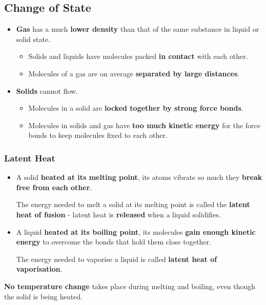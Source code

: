 \subsection{Change of State}

\begin{itemize}
    \item \textbf{Gas} has a much \textbf{lower density} than that of the same substance in liquid or solid state.
        \begin{itemize}
            \item Solids and liquids have molecules packed \textbf{in contact} with each other.
            \item Molecules of a gas are on average \textbf{separated by large distances}.
        \end{itemize}
    \item \textbf{Solids} cannot flow.
        \begin{itemize}
            \item Molecules in a solid are \textbf{locked together by strong force bonds}.
            \item Molecules in solids and gas have \textbf{too much kinetic energy} for the force bonds to keep molecules fixed to each other.
        \end{itemize}
\end{itemize}

\subsubsection*{Latent Heat}

\begin{itemize}
    \item A solid \textbf{heated at its melting point}, its atoms vibrate so much they \textbf{break free from each other}.

        The energy needed to melt a solid at its melting point is called the \textbf{latent heat of fusion} - latent heat is \textbf{released} when a liquid solidifies.
    \item A liquid \textbf{heated at its boiling point}, its molecules \textbf{gain enough kinetic energy} to overcome the bonds that hold them close together.

        The energy needed to vaporise a liquid is called \textbf{latent heat of vaporisation}.
\end{itemize}

\textbf{No temperature change} takes place during melting and boiling, even though the solid is being heated.

